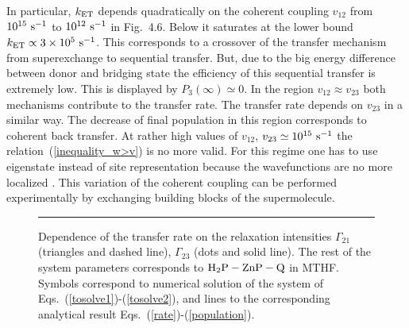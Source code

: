 \documentclass[12pt,twoside,a4paper]{report}
\begin{document}
In particular, 
$k_{\rm ET}$ depends quadratically on
the coherent coupling $v_{12}$ 
from  $10^{15}  ~{\rm s}^{-1}$ 
to    $10^{12}  ~{\rm s}^{-1}$ 
in Fig.~4.6.
Below it
saturates at the lower bound  
$k_{\rm ET} 
            \propto   3   
                      \times 
                      10^{5}  
                      ~{\rm s}^{-1}$.  
This corresponds to a crossover of the
transfer mechanism from superexchange to sequential
transfer.  But, due to the big energy difference between donor and
bridging state the efficiency of this sequential transfer is extremely
low.  This is displayed by $P_3(\infty) \simeq 0$.  In the region
$v_{12} \approx v_{23}$  
both mechanisms contribute
to the transfer rate.  The transfer rate depends on $v_{23}$ in a
similar way.  
The decrease of final population in this region corresponds
to coherent back transfer.  At rather high values of $v_{12}$, $v_{23}
\simeq 10^{15} ~{\rm s}^{-1}$ the relation~(\ref{inequality_w>v}) is
no more valid. For this regime one has to use eigenstate  instead of
site representation because the wavefunctions are no more localized \cite{davi98}. 
This variation of the coherent coupling
can be performed  experimentally by exchanging  building blocks of
the supermolecule. 


\footnotesize\begin{figure}[!h]\centering
  \parbox{7cm}
  {\rule{-3cm}{0cm}
\epsfxsize=9cm}
\caption[Dependence of the transfer rate on the relaxation intensities ]
{\small 
\label{chem:gamma-B}
Dependence of the transfer rate 
on the relaxation intensities 
$\Gamma_{21}$ (triangles and dashed line), 
$\Gamma_{23}$ (dots and solid line). 
The rest of the system parameters corresponds to
${\rm H_2P-ZnP-Q}$ in MTHF.
Symbols correspond to numerical solution  
of the system of Eqs.~(\ref{tosolve1})-(\ref{tosolve2}), and
lines to the  corresponding  analytical result Eqs.~(\ref{rate})-(\ref{population}). 
}
\end{figure}\normalsize 
\end{document}
